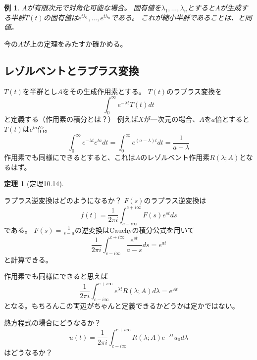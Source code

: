 \documentclass{jsarticle}
\newtheorem{eg}{例}
\newtheorem{thm}{定理}
\begin{document}
\begin{eg}
$A$が有限次元で対角化可能な場合。
固有値を$\lambda_1,\ldots,\lambda_n$とすると$A$が生成する半群$T(t)$の固有値は$e^{t\lambda_1},\ldots,e^{t\lambda_n}$である。
これが縮小半群であることは、と同値。
\end{eg}

今の$A$が上の定理をみたすか確かめる。

\subsection{レゾルベントとラプラス変換}
$T(t)$を半群とし$A$をその生成作用素とする。
$T(t)$のラプラス変換を
\[
\int_0^\infty e^{-\lambda t}T(t)dt
\]
と定義する（作用素の積分とは？）
例えば$X$が一次元の場合、$A$を$a$倍とすると$T(t)$は$e^{ta}$倍。
\[
\int_0^\infty e^{-\lambda t}e^{ta}dt=\int_0^\infty e^{(a-\lambda)t}dt=\frac{1}{a-\lambda}
\]
作用素でも同様にできるとすると、これは$A$のレゾルベント作用素$R(\lambda;A)$となるはず。
\begin{thm}[定理10.14]
\end{thm}

ラプラス逆変換はどのようになるか？
$F(s)$のラプラス逆変換は
\[
f(t)=\frac{1}{2\pi i}\int^{c+i\infty}_{c-i\infty}F(s)e^{st}ds
\]
である。
$F(s)=\frac{1}{s-a}$の逆変換はCauchyの積分公式を用いて
\[
\frac{1}{2\pi i}\int^{c+i\infty}_{c-i\infty}\frac{e^{st}}{a-s}ds=e^{at}
\]
と計算できる。

作用素でも同様にできると思えば
\[
\frac{1}{2\pi i}\int^{c+i\infty}_{c-i\infty}e^{\lambda t}R(\lambda;A)d\lambda=e^{At}
\]
となる。もちろんこの両辺がちゃんと定義できるかどうかは定かではない。

熱方程式の場合にどうなるか？
\[
u(t)=\frac{1}{2\pi i}\int^{c+i\infty}_{c-i\infty}R(\lambda;A)e^{-\lambda t}u_0d\lambda
\]
はどうなるか？
\end{document}
